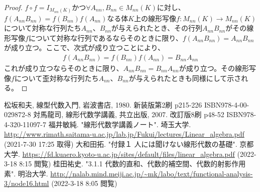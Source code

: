 \documentclass[dvipdfmx]{jsarticle}
\begin{document}
\begin{proof}
$f \circ f = I_{M_{nn}(K)}$かつ$\forall A_{nn},B_{nn} \in M_{nn}(K)$に対し、$f\left( A_{nn}B_{nn} \right) = f\left( B_{nn} \right)f\left( A_{nn} \right)$なる体$K$上の線形写像$f:M_{nn}(K) \rightarrow M_{nn}(K)$について対称な行列たち$A_{nn}$、$B_{nn}$が与えられたとき、その行列$A_{nn}B_{nn}$がその線形写像$f$について対称な行列であるならそのときに限り、$f\left( A_{nn}B_{nn} \right) = A_{nn}B_{nn}$が成り立つ。ここで、次式が成り立つことにより、
\begin{align*}
f\left( A_{nn}B_{nn} \right) = f\left( B_{nn} \right)f\left( A_{nn} \right) = B_{nn}A_{nn}
\end{align*}
これが成り立つならそのときに限り、$A_{nn}B_{nn} = B_{nn}A_{nn}$が成り立つ。その線形写像$f$について歪対称な行列たち$A_{nn}$、$B_{nn}$が与えられたときも同様にして示される。
\end{proof}
\begin{thebibliography}{50}
    松坂和夫, 線型代数入門, 岩波書店, 1980. 新装版第2刷 p215-226 ISBN978-4-00-029872-8
    対馬龍司, 線形代数学講義, 共立出版, 2007. 改訂版8刷 p48-52 ISBN978-4-320-11097-7
    福井敏純. "線形代数学講義ノート". 埼玉大学. \url{http://www.rimath.saitama-u.ac.jp/lab.jp/Fukui/lectures/Linear_algebra.pdf} (2021-7-30 17:25 取得)
    大和田拓. "付録１ 人には聞けない線形代数の基礎". 京都大学. \url{https://fd.kuaero.kyoto-u.ac.jp/sites/default/files/linear_algebra.pdf} (2022-3-18 8:15 閲覧)
    桂田祐史. "3.1.1 代数的直和、代数的補空間、代数的射影作用素". 明治大学. \url{http://nalab.mind.meiji.ac.jp/~mk/labo/text/functional-analysis-3/node16.html} (2022-3-18 8:05 閲覧)
\end{thebibliography}
\end{document}
